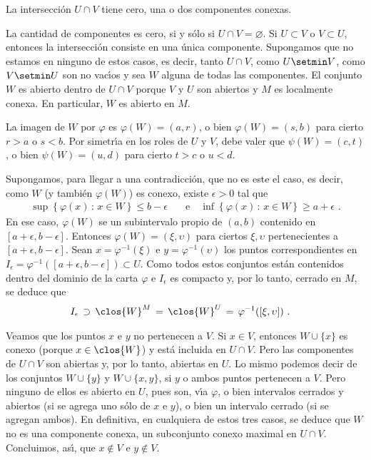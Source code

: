 \begin{propoALoSumoDosComponentes}\label{thm:alosumodoscomponentes}
	La intersecci\'{o}n $U\cap V$ tiene cero, una o dos componentes
	conexas.
\end{propoALoSumoDosComponentes}

La cantidad de componentes es cero, si y s\'{o}lo si $U\cap V=\varnothing$.
Si $U\subset V$ o $V\subset U$, entonces la intersecci\'{o}n consiste en una
\'{u}nica componente. Supongamos que no estamos en ninguno de estos casos,
es decir, tanto $U\cap V$, como $U\setmin V$, como $V\setmin U$ son no
vac\'{\i}os y sea $W$ alguna de todas las componentes. El conjunto $W$ es
abierto dentro de $U\cap V$ porque $V$ y $U$ son abiertos y $M$ es localmente
conexa. En particular, $W$ es abierto en $M$.

\begin{lemaEsSubintervaloExterno}\label{thm:essubintervaloexterno}
	La imagen de $W$ por $\varphi$ es $\varphi(W)=(a,r)$, o bien
	$\varphi(W)=(s,b)$ para cierto $r>a$ o $s<b$. Por simetr\'{\i}a
	en los roles de $U$ y $V$, debe valer que $\psi(W)=(c,t)$, o bien
	$\psi(W)=(u,d)$ para cierto $t>c$ o $u<d$.
\end{lemaEsSubintervaloExterno}

Supongamos, para llegar a una contradicci\'{o}n, que no es este el caso,
es decir, como $W$ (y tambi\'{e}n $\varphi(W)$) es conexo, existe
$\epsilon>0$ tal que
\begin{align*}
	\sup\left\lbrace\varphi(x)\,:\,x\in W\right\rbrace\leq b-\epsilon
	& \quad\text{e}\quad
	\inf\left\lbrace\varphi(x)\,:\,x\in W\right\rbrace \geq a+\epsilon
	\text{ .}
\end{align*}
%
En ese caso, $\varphi(W)$ se un subintervalo propio de $(a,b)$ contenido
en $[a+\epsilon,b-\epsilon]$. Entonces $\varphi(W)=(\xi,\upsilon)$ para
ciertos $\xi,\upsilon$ pertenecientes a $[a+\epsilon,b-\epsilon]$. Sean
$x=\varphi^{-1}(\xi)$ e $y=\varphi^{-1}(\upsilon)$ los puntos
correspondientes en $I_{\epsilon}=\varphi^{-1}([a+\epsilon,b-\epsilon])%
\subset U$. Como todos estos conjuntos est\'{a}n contenidos dentro del
dominio de la carta $\varphi$ e $I_{\epsilon}$ es compacto y, por lo
tanto, cerrado en $M$, se deduce que
\begin{align*}
	I_{\epsilon} & \,\supset\, \clos{W}^{M}\,=\,\clos{W}^{U}
		\,=\,\varphi^{-1}([\xi,\upsilon])
	\text{ .}
\end{align*}
%

Veamos que los puntos $x$ e $y$ no pertenecen a $V$. Si $x\in V$, entonces
$W\cup\{x\}$ es conexo (porque $x\in\clos{W}$) y est\'{a} incluida en
$U\cap V$. Pero las componentes de $U\cap V$ son abiertas y, por lo tanto,
abiertas en $U$. Lo mismo podemos decir de los conjuntos
$W\cup\{y\}$ y $W\cup\{x,y\}$, si $y$ o ambos puntos pertenecen a $V$.
Pero ninguno de ellos es abierto en $U$, pues son, v\'{\i}a $\varphi$, o
bien intervalos cerrados y abiertos (si se agrega uno s\'{o}lo de $x$ e $y$),
o bien un intervalo cerrado (si se agregan ambos). En definitiva, en
cualquiera de estos tres casos, se deduce que $W$ no es una componente
conexa, un subconjunto conexo maximal en $U\cap V$. Concluimos, as\'{\i},
que $x\not\in V$ e $y\not\in V$.

